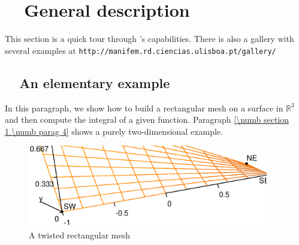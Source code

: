 
\chapter{~~General description}\label{\numb section 1}

This section is a quick tour through \maniFEM's capabilities.
There is also a gallery with several examples at
{\small\tt http://manifem.rd.ciencias.ulisboa.pt/gallery/}


\section{~~An elementary example}\label{\numb section 1.\numb parag 1}

In this paragraph, we show how to build a rectangular mesh on a surface in $ \mathbb{R}^3 $ 
and then compute the integral of a given function.
Paragraph \ref{\numb section 1.\numb parag 4} shows a purely two-dimensional example.

\begin{figure} \centering
  \includegraphics[width=105mm]{3d-rectangle}
  \caption{A twisted rectangular mesh}
  \label{\numb section 1.\numb fig 1}
\end{figure}

